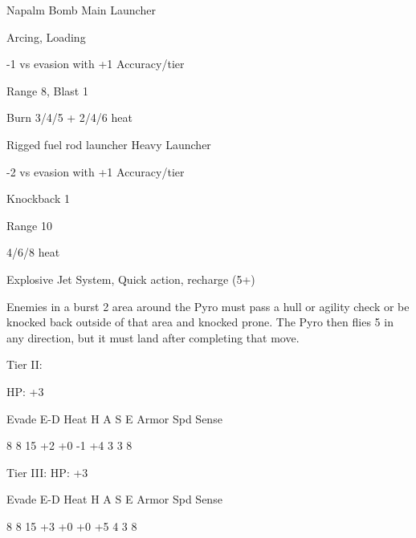 Napalm Bomb
Main Launcher

Arcing, Loading

-1 vs evasion with +1 Accuracy/tier

Range 8, Blast 1

Burn 3/4/5 + 2/4/6 heat


Rigged fuel rod launcher
Heavy Launcher

-2 vs evasion with +1 Accuracy/tier

Knockback 1

Range 10

4/6/8 heat


Explosive Jet
System, Quick action, recharge (5+)

Enemies in a burst 2 area around the Pyro must pass a hull or agility check or be knocked back
outside of that area and knocked prone. The Pyro then flies 5 in any direction, but it must land
after completing that move.


Tier II:

HP: +3


          Evade    E-D    Heat    H     A    S     E       Armor        Spd      Sense

          8        8      15      +2    +0   -1    +4       3           3         8

Tier III:
HP: +3


          Evade    E-D    Heat    H     A    S     E       Armor        Spd      Sense

          8        8      15      +3    +0   +0    +5       4           3         8

